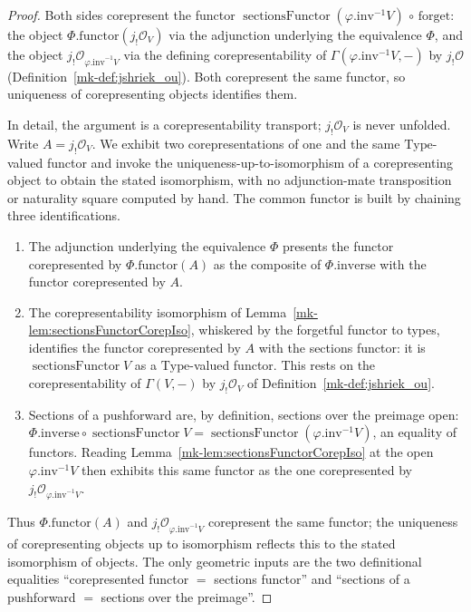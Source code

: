 \begin{proof}
  Both sides corepresent the functor \(\operatorname{sectionsFunctor}(\varphi.\mathrm{inv}^{-1}V)
  \,\circ\, \mathrm{forget}\): the object \(\Phi.\mathrm{functor}(j_!\mathcal{O}_V)\) via the
  adjunction underlying the equivalence \(\Phi\), and the object
  \(j_!\mathcal{O}_{\varphi.\mathrm{inv}^{-1}V}\) via the defining corepresentability of
  \(\Gamma(\varphi.\mathrm{inv}^{-1}V,{-})\) by \(j_!\mathcal{O}\)
  (Definition~\ref{mk-def:jshriek_ou}). Both corepresent the same functor, so uniqueness of
  corepresenting objects identifies them.

  In detail, the argument is a corepresentability transport; \(j_!\mathcal{O}_V\) is never unfolded.
  Write \(A = j_!\mathcal{O}_V\). We exhibit two corepresentations of one and the same
  \(\mathrm{Type}\)-valued functor and invoke the uniqueness-up-to-isomorphism of a corepresenting
  object to obtain the stated isomorphism, with no adjunction-mate transposition or naturality square
  computed by hand. The common functor is built by chaining three identifications.
  \begin{enumerate}
    \item The adjunction underlying the equivalence \(\Phi\) presents the functor corepresented by
      \(\Phi.\mathrm{functor}(A)\) as the composite of \(\Phi.\mathrm{inverse}\) with the functor
      corepresented by \(A\).
    \item The corepresentability isomorphism of Lemma~\ref{mk-lem:sectionsFunctorCorepIso}, whiskered by the
      forgetful functor to types, identifies the functor corepresented by \(A\) with the sections
      functor: it is \(\operatorname{sectionsFunctor} V\) as a \(\mathrm{Type}\)-valued functor. This
      rests on the corepresentability of \(\Gamma(V,-)\) by \(j_!\mathcal{O}_V\) of
      Definition~\ref{mk-def:jshriek_ou}.
    \item Sections of a pushforward are, by definition, sections over the preimage open:
      \(\Phi.\mathrm{inverse} \circ \operatorname{sectionsFunctor} V =
      \operatorname{sectionsFunctor}(\varphi.\mathrm{inv}^{-1}V)\), an equality of functors. Reading
      Lemma~\ref{mk-lem:sectionsFunctorCorepIso} at the open \(\varphi.\mathrm{inv}^{-1}V\) then exhibits
      this same functor as the one corepresented by \(j_!\mathcal{O}_{\varphi.\mathrm{inv}^{-1}V}\).
  \end{enumerate}
  Thus \(\Phi.\mathrm{functor}(A)\) and \(j_!\mathcal{O}_{\varphi.\mathrm{inv}^{-1}V}\) corepresent the
  same functor; the uniqueness of corepresenting objects up to isomorphism reflects this to the stated
  isomorphism of objects. The only geometric inputs are the two definitional equalities
  ``corepresented functor \(=\) sections functor'' and ``sections of a pushforward \(=\) sections over
  the preimage''.
\end{proof}

